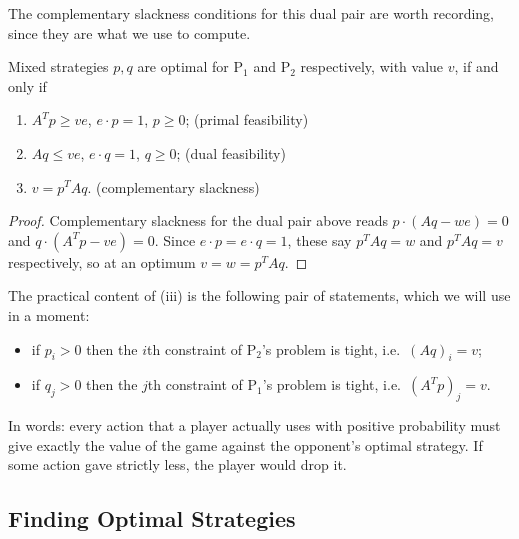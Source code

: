 \documentclass[a4paper]{scrartcl}
\begin{document}
The complementary slackness conditions for this dual pair are worth recording, since they are what we use to compute.

\begin{theorem}
    Mixed strategies $p, q$ are optimal for $\mathrm{P}_1$ and $\mathrm{P}_2$ respectively, with value $v$, if and only if
    \begin{enumerate}[label=(\roman*)]
        \item $A^Tp \geq ve$, $e\cdot p = 1$, $p \geq 0$; \hfill (primal feasibility)
        \item $Aq \leq ve$, $e\cdot q = 1$, $q \geq 0$; \hfill (dual feasibility)
        \item $v = p^TAq$. \hfill (complementary slackness)
    \end{enumerate}
\end{theorem}
\begin{proof}
    Complementary slackness for the dual pair above reads $p\cdot(Aq - we) = 0$ and $q\cdot(A^Tp - ve) = 0$. Since $e\cdot p = e\cdot q = 1$, these say $p^TAq = w$ and $p^TAq = v$ respectively, so at an optimum $v = w = p^TAq$.
\end{proof}

The practical content of (iii) is the following pair of statements, which we will use in a moment:
\begin{itemize}
    \item if $p_i > 0$ then the $i$th constraint of $\mathrm{P}_2$'s problem is tight, i.e.\ $(Aq)_i = v$;
    \item if $q_j > 0$ then the $j$th constraint of $\mathrm{P}_1$'s problem is tight, i.e.\ $(A^Tp)_j = v$.
\end{itemize}
In words: every action that a player actually uses with positive probability must give exactly the value of the game against the opponent's optimal strategy. If some action gave strictly less, the player would drop it.

\subsection{Finding Optimal Strategies}
\end{document}
